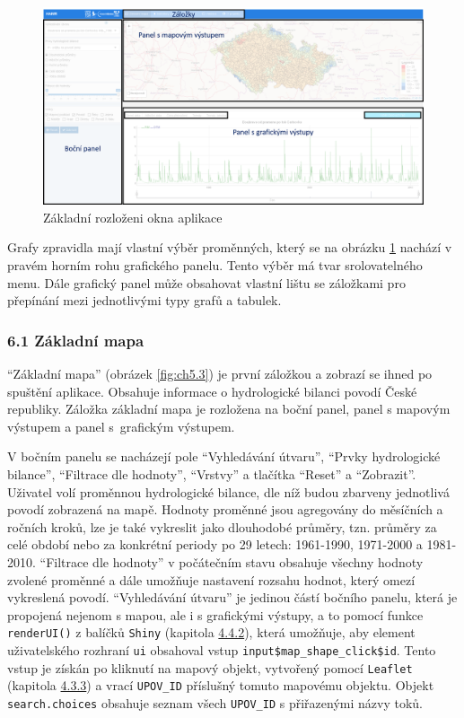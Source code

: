 \documentclass[12pt,]{article}
\begin{document}
\begin{figure}[H]
      \includegraphics[width=\textwidth]{fig/rozlozeni2}
      \caption{Základní rozloženi okna aplikace}
      \label{fig:ch5.2}
\end{figure}

\qquad Grafy zpravidla mají vlastní výběr proměnných, který se na
obrázku \ref{fig:ch5.2} nachází v pravém horním rohu grafického panelu.
Tento výběr má tvar srolovatelného menu. Dále grafický panel může
obsahovat vlastní lištu se záložkami pro přepínání mezi jednotlivými
typy grafů a tabulek.

\subsubsection{6.1 Základní mapa}\label{zakladni-mapa}

\qquad \enquote{Základní mapa} (obrázek \ref{fig:ch5.3}) je první
záložkou a zobrazí se ihned po spuštění aplikace. Obsahuje informace o
hydrologické bilanci povodí České republiky. Záložka základní mapa je
rozložena na boční panel, panel s mapovým výstupem a panel s~grafickým
výstupem.

\qquad V bočním panelu se nacházejí pole \enquote{Vyhledávání útvaru},
\enquote{Prvky hydrologické bilance}, \enquote{Filtrace dle hodnoty},
\enquote{Vrstvy} a tlačítka \enquote{Reset} a \enquote{Zobrazit}.
Uživatel volí proměnnou hydrologické bilance, dle níž budou zbarveny
jednotlivá povodí zobrazená na mapě. Hodnoty proměnné jsou agregovány do
měsíčních a ročních kroků, lze je také vykreslit jako dlouhodobé
průměry, tzn. průměry za celé období nebo za konkrétní periody po 29
letech: 1961-1990, 1971-2000 a 1981-2010. \enquote{Filtrace dle hodnoty}
v počátečním stavu obsahuje všechny hodnoty zvolené proměnné a dále
umožňuje nastavení rozsahu hodnot, který omezí vykreslená povodí.
\enquote{Vyhledávání útvaru} je jedinou částí bočního panelu, která je
propojená nejenom s mapou, ale i s grafickými výstupy, a to pomocí
funkce \texttt{renderUI()} z balíčků \texttt{Shiny} (kapitola
\protect\hyperlink{shiny}{4.4.2}), která umožňuje, aby element
uživatelského rozhraní \texttt{ui} obsahoval vstup
\texttt{input\$map\_shape\_click\$id}. Tento vstup je získán po kliknutí
na mapový objekt, vytvořený pomocí \texttt{Leaflet} (kapitola
\protect\hyperlink{leaflet}{4.3.3}) a vrací \texttt{UPOV\_ID} příslušný
tomuto mapovému objektu. Objekt \texttt{search.choices} obsahuje seznam
všech \texttt{UPOV\_ID} s přiřazenými názvy toků.
\end{document}
